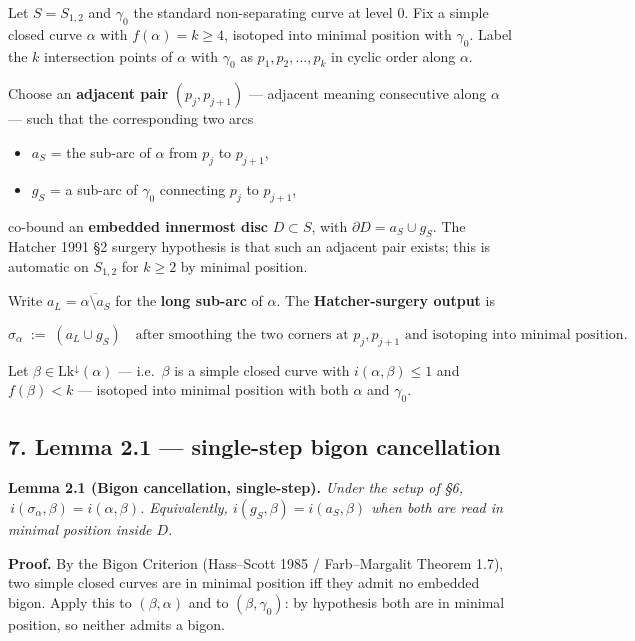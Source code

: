 \documentclass[
]{article}
\providecommand{\tightlist}{%
  \setlength{\itemsep}{0pt}\setlength{\parskip}{0pt}}
\begin{document}
Let \(S = S_{1,2}\) and \(\gamma_0\) the standard non-separating curve
at level \(0\). Fix a simple closed curve \(\alpha\) with
\(f(\alpha) = k \ge 4\), isotoped into minimal position with
\(\gamma_0\). Label the \(k\) intersection points of \(\alpha\) with
\(\gamma_0\) as \(p_1, p_2, \ldots, p_k\) in cyclic order along
\(\alpha\).

Choose an \textbf{adjacent pair} \((p_j, p_{j+1})\) --- adjacent meaning
consecutive along \(\alpha\) --- such that the corresponding two arcs

\begin{itemize}
\tightlist
\item
  \(a_S\) = the sub-arc of \(\alpha\) from \(p_j\) to \(p_{j+1}\),
\item
  \(g_S\) = a sub-arc of \(\gamma_0\) connecting \(p_j\) to \(p_{j+1}\),
\end{itemize}

co-bound an \textbf{embedded innermost disc} \(D \subset S\), with
\(\partial D = a_S \cup g_S\). The Hatcher 1991 §2 surgery hypothesis is
that such an adjacent pair exists; this is automatic on \(S_{1,2}\) for
\(k \ge 2\) by minimal position.

Write \(a_L = \overline{\alpha \setminus a_S}\) for the \textbf{long
sub-arc} of \(\alpha\). The \textbf{Hatcher-surgery output} is

\[
\sigma_\alpha \;:=\; (a_L \cup g_S) \quad
\text{after smoothing the two corners at } p_j, p_{j+1}
\text{ and isotoping into minimal position.}
\]

Let \(\beta \in \mathrm{Lk}^\downarrow(\alpha)\) --- i.e.~\(\beta\) is a
simple closed curve with \(i(\alpha, \beta) \le 1\) and \(f(\beta) < k\)
--- isotoped into minimal position with both \(\alpha\) and
\(\gamma_0\).

\subsection{7. Lemma 2.1 --- single-step bigon
cancellation}\label{lemma-2.1-single-step-bigon-cancellation}

\textbf{Lemma 2.1 (Bigon cancellation, single-step).} \emph{Under the
setup of §6, \(\,i(\sigma_\alpha, \beta) = i(\alpha, \beta)\).
Equivalently, \(i(g_S, \beta) = i(a_S, \beta)\) when both are read in
minimal position inside \(D\).}

\textbf{Proof.} By the Bigon Criterion (Hass--Scott 1985 /
Farb--Margalit Theorem 1.7), two simple closed curves are in minimal
position iff they admit no embedded bigon. Apply this to
\((\beta, \alpha)\) and to \((\beta, \gamma_0)\): by hypothesis both are
in minimal position, so neither admits a bigon.
\end{document}
